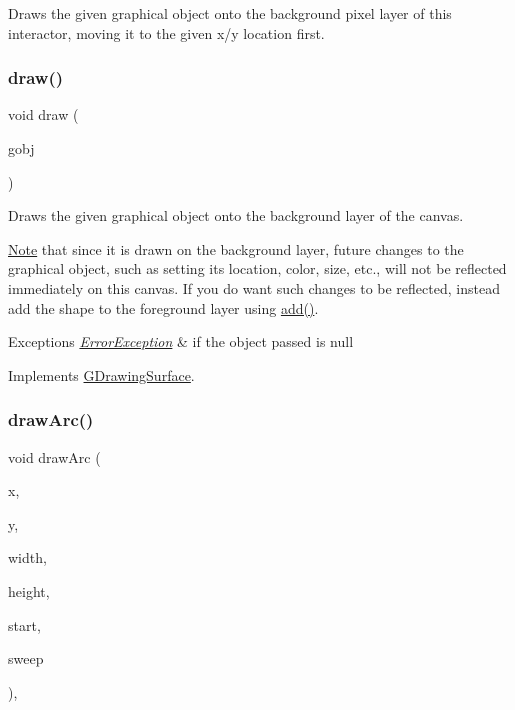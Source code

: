 Draws the given graphical object onto the background pixel layer of this interactor, moving it to the given x/y location first. 

\mbox{\label{classGCanvas_a00bf9d87527d59e6f11756589c25e4e7}} 
\subsubsection{\texorpdfstring{draw()}{draw()}\hspace{0.1cm}{\footnotesize\ttfamily [4/4]}}
{\footnotesize\ttfamily void draw (\begin{DoxyParamCaption}\item[{\mbox{\hyperlink{classGObject}{G\+Object}} $\ast$}]{gobj }\end{DoxyParamCaption})\hspace{0.3cm}{\ttfamily [virtual]}}



Draws the given graphical object onto the background layer of the canvas. 

\mbox{\hyperlink{classNote}{Note}} that since it is drawn on the background layer, future changes to the graphical object, such as setting its location, color, size, etc., will not be reflected immediately on this canvas. If you do want such changes to be reflected, instead add the shape to the foreground layer using \mbox{\hyperlink{classGCanvas_afe8277e7b2627513c6f7452fb0b2847d}{add()}}. 
\begin{DoxyExceptions}{Exceptions}
{\em \mbox{\hyperlink{classErrorException}{Error\+Exception}}} & if the object passed is null \\
\hline
\end{DoxyExceptions}


Implements \mbox{\hyperlink{classGDrawingSurface_ae65b7cc9bdfbc1bd01bec80ba83aab47}{G\+Drawing\+Surface}}.

\mbox{\label{classGDrawingSurface_a38b6fae1045191c57092b49905068144}} 
\subsubsection{\texorpdfstring{draw\+Arc()}{drawArc()}}
{\footnotesize\ttfamily void draw\+Arc (\begin{DoxyParamCaption}\item[{double}]{x,  }\item[{double}]{y,  }\item[{double}]{width,  }\item[{double}]{height,  }\item[{double}]{start,  }\item[{double}]{sweep }\end{DoxyParamCaption})\hspace{0.3cm}{\ttfamily [virtual]}, {\ttfamily [inherited]}}




